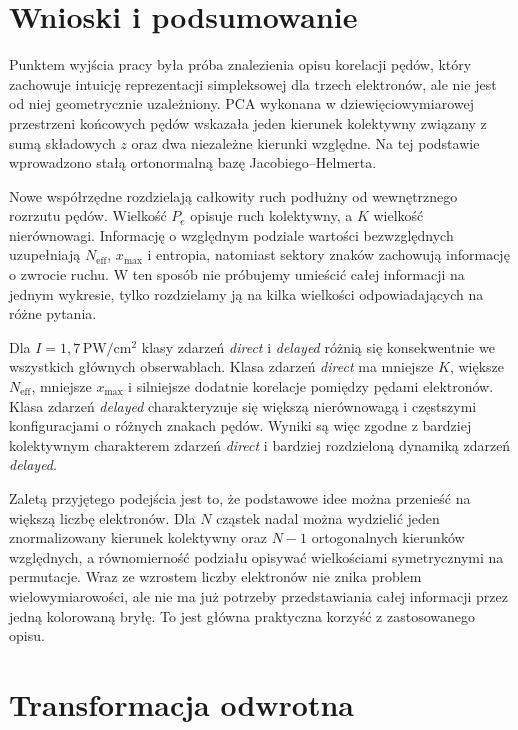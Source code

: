 \documentclass[12pt,letterpaper,oneside]{report}
\numberwithin{equation}{chapter}
\numberwithin{figure}{chapter}
\numberwithin{table}{chapter}
\newcommand{\direct}{\textit{direct}}
\newcommand{\delayed}{\textit{delayed}}
\begin{document}
\chapter{Wnioski i podsumowanie}

Punktem wyjścia pracy była próba znalezienia opisu korelacji pędów, który zachowuje intuicję reprezentacji simpleksowej dla trzech elektronów, ale nie jest od niej geometrycznie uzależniony. PCA wykonana w dziewięciowymiarowej przestrzeni końcowych pędów wskazała jeden kierunek kolektywny związany z sumą składowych $z$ oraz dwa niezależne kierunki względne. Na tej podstawie wprowadzono stałą ortonormalną bazę Jacobiego--Helmerta.

Nowe współrzędne rozdzielają całkowity ruch podłużny od wewnętrznego rozrzutu pędów. Wielkość $P_e$ opisuje ruch kolektywny, a $K$ wielkość nierównowagi. Informację o względnym podziale wartości bezwzględnych uzupełniają $N_{\mathrm{eff}}$, $x_{\max}$ i entropia, natomiast sektory znaków zachowują informację o zwrocie ruchu. W ten sposób nie próbujemy umieścić całej informacji na jednym wykresie, tylko rozdzielamy ją na kilka wielkości odpowiadających na różne pytania.

Dla $I=1{,}7\,\mathrm{PW/cm^2}$ klasy zdarzeń \direct{} i \delayed{} różnią się konsekwentnie we wszystkich głównych obserwablach. Klasa zdarzeń \direct{} ma mniejsze $K$, większe $N_{\mathrm{eff}}$, mniejsze $x_{\max}$ i silniejsze dodatnie korelacje pomiędzy pędami elektronów. Klasa zdarzeń \delayed{} charakteryzuje się większą nierównowagą i częstszymi konfiguracjami o różnych znakach pędów. Wyniki są więc zgodne z bardziej kolektywnym charakterem zdarzeń \direct{} i bardziej rozdzieloną dynamiką zdarzeń \delayed{}.

Zaletą przyjętego podejścia jest to, że podstawowe idee można przenieść na większą liczbę elektronów. Dla $N$ cząstek nadal można wydzielić jeden znormalizowany kierunek kolektywny oraz $N-1$ ortogonalnych kierunków względnych, a równomierność podziału opisywać wielkościami symetrycznymi na permutacje. Wraz ze wzrostem liczby elektronów nie znika problem wielowymiarowości, ale nie ma już potrzeby przedstawiania całej informacji przez jedną kolorowaną bryłę. To jest główna praktyczna korzyść z zastosowanego opisu.

\appendix
\chapter{Transformacja odwrotna}
\end{document}
